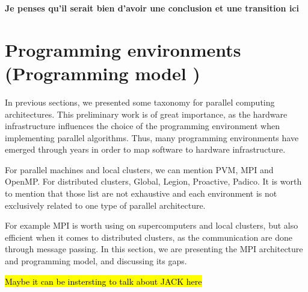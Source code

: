 \textbf{Je penses qu'il serait bien d'avoir une conclusion et une transition ici}


\section{Programming environments (Programming model )}




In previous sections, we presented some taxonomy for parallel computing architectures. This preliminary work is of great importance, as the hardware infrastructure influences the choice of the programming environment when implementing parallel algorithms. Thus, many programming environments have emerged through years in order to map software to hardware infrastructure.

For parallel machines and local clusters, we can mention PVM, MPI and OpenMP. For distributed clusters, Global, Legion, Proactive, Padico. It is worth to mention that those list are not exhaustive and each environment is not exclusively related to one type of parallel architecture. 


For example MPI is worth using on supercomputers and local clusters, but  also efficient when it comes to distributed clusters, as the communication are done through message passing. In this section, we are presenting the MPI architecture and programming model, and discussing its gaps.

\hl{Maybe it can be instersting to talk about JACK here}







